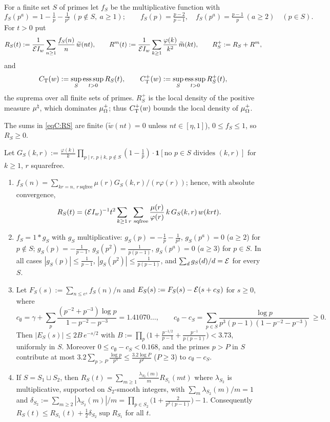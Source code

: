\begin{definition}\label{def:RS}
For a finite set $S$ of primes let $f_S$ be the multiplicative function with
\[
 f_S(p^a)=1-\tfrac1p-\tfrac1{p^2}\ (p\notin S,\ a\ge1);\qquad f_S(p)=\tfrac{p-2}{p-1},\quad f_S(p^a)=\tfrac{p-1}p\ (a\ge2)\quad(p\in S).
\]
For $t>0$ put
\begin{equation}\label{eqC:RS}
 R_S(t):=\frac1{\mathcal{E}I_w}\sum_{n\ge1}\frac{f_S(n)}n\,\widetilde w(nt),\qquad
 R^m(t):=\frac1{\mathcal{E}I_w}\sum_{k\ge1}\frac{\varphi(k)}{k^2}\,\widetilde m(kt),\qquad R^+_S:=R_S+R^m,
\end{equation}
and
\[
 C_{\mathrm T}(w):=\sup_S\operatorname*{ess\,sup}_{t>0}R_S(t),\qquad C^{+}_{\mathrm T}(w):=\sup_S\operatorname*{ess\,sup}_{t>0}R^+_S(t),
\]
the suprema over all finite sets of primes. $R^+_S$ is the local density of the positive measure $\mu^\natural$, which
dominates $\mu_\Omega^+$; thus $C^{+}_{\mathrm T}(w)$ bounds the local density of $\mu_\Omega^+$.
\end{definition}

The sums in \eqref{eqC:RS} are finite ($\widetilde w(nt)=0$ unless $nt\in[\eta,1]$), $0\le f_S\le1$, so $R_S\ge0$.

\begin{lemma}\label{lem:fS}
Let $G_S(k,r):=\frac{\varphi(k)}k\prod_{p\mid r,\,p\nmid k,\,p\notin S}(1-\frac1p)\cdot\mathbf 1[\text{no }p\in S\text{ divides }(k,r)]$ for $k\ge1$, $r$ squarefree.
\begin{enumerate}
\item[(i)] $f_S(n)=\sum_{kr=n,\ r\ \mathrm{sqfree}}\mu(r)G_S(k,r)/(r\varphi(r))$; hence, with absolute convergence,
 \[
 R_S(t)=(\Ec\WIw)^{-1}t^2\sum_{k\ge1}\sum_{r\ \mathrm{sqfree}}\frac{\mu(r)}{\varphi(r)}\,k\,G_S(k,r)\,w(krt).
 \]
\item[(ii)] $f_S=1*g_S$ with $g_S$ multiplicative: $g_S(p)=-\frac1p-\frac1{p^2}$, $g_S(p^a)=0$ ($a\ge2$) for $p\notin S$;
 $g_S(p)=-\frac1{p-1}$, $g_S(p^2)=\frac1{p(p-1)}$, $g_S(p^a)=0$ ($a\ge3$) for $p\in S$. In all cases $|g_S(p)|\le\frac1{p-1}$,
 $|g_S(p^2)|\le\frac1{p(p-1)}$, and $\sum_dg_S(d)/d=\mathcal{E}$ for every $S$.
\item[(iii)] Let $F_S(s):=\sum_{n\le e^s}f_S(n)/n$ and $E_S(s):=F_S(s)-\mathcal{E}(s+c_S)$ for $s\ge0$, where
 \[
 c_\emptyset=\gamma+\sum_p\frac{(p^{-2}+p^{-3})\log p}{1-p^{-2}-p^{-3}}=1.41070\ldots,\qquad
 c_\emptyset-c_S=\sum_{p\in S}\frac{\log p}{p^3(p-1)(1-p^{-2}-p^{-3})}\ \ge0 .
 \]
 Then $|E_S(s)|\le2B\,e^{-s/2}$ with $B:=\prod_p\big(1+\frac{p^{-1/2}}{p-1}+\frac{p^{-1}}{p(p-1)}\big)<3.73$, uniformly in $S$. Moreover
 $0\le c_\emptyset-c_S<0.168$, and the primes $p>P$ in $S$ contribute at most $3.2\sum_{p>P}\frac{\log p}{p^4}\le\frac{3.2\log P}{P^3}$
 ($P\ge3$) to $c_\emptyset-c_S$.
\item[(iv)] If $S=S_1\sqcup S_2$, then $R_S(t)=\sum_{m\ge1}\frac{\lambda_{S_2}(m)}m R_{S_1}(mt)$ where $\lambda_{S_2}$ is multiplicative,
 supported on $S_2$-smooth integers, with $\sum_m\lambda_{S_2}(m)/m=1$ and
 $\delta_{S_2}:=\sum_{m\ge2}|\lambda_{S_2}(m)|/m=\prod_{p\in S_2}\big(1+\frac2{p^3(p-1)}\big)-1$. Consequently
 $R_S(t)\le R_{S_1}(t)+\frac12\delta_{S_2}\sup R_{S_1}$ for all $t$.
\end{enumerate}
\end{lemma}

